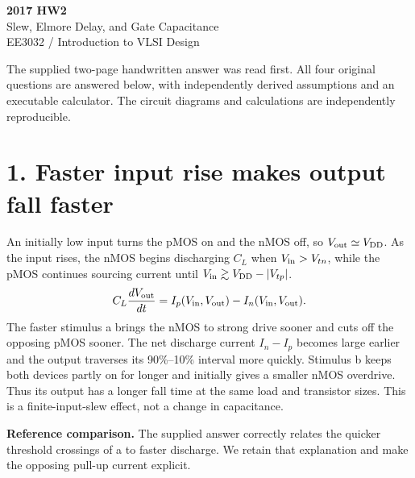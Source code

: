 \documentclass[11pt,a4paper]{article}
\newcommand{\VDD}{V_{\mathrm{DD}}}
\begin{document}
\begin{center}{\LARGE\bfseries 2017 HW2}\\[4pt]{\large Slew, Elmore Delay, and Gate Capacitance}\\[4pt]{\small EE3032 / Introduction to VLSI Design}\end{center}
The supplied two-page handwritten answer was read first. All four original questions are answered below, with independently derived assumptions and an executable calculator. The circuit diagrams and calculations are independently reproducible.
\section*{1. Faster input rise makes output fall faster}
An initially low input turns the pMOS on and the nMOS off, so $V_{\rm out}\simeq\VDD$. As the input rises, the nMOS begins discharging $C_L$ when $V_{\rm in}>V_{tn}$, while the pMOS continues sourcing current until $V_{\rm in}\gtrsim\VDD-|V_{tp}|$.
\[
 C_L\frac{dV_{\rm out}}{dt}=I_p(V_{\rm in},V_{\rm out})-I_n(V_{\rm in},V_{\rm out}).
\]
The faster stimulus a brings the nMOS to strong drive sooner and cuts off the opposing pMOS sooner. The net discharge current $I_n-I_p$ becomes large earlier and the output traverses its 90\%--10\% interval more quickly. Stimulus b keeps both devices partly on for longer and initially gives a smaller nMOS overdrive. Thus its output has a longer fall time at the same load and transistor sizes. This is a finite-input-slew effect, not a change in capacitance.
\begin{center}\end{center}
\textbf{Reference comparison.} The supplied answer correctly relates the quicker threshold crossings of a to faster discharge. We retain that explanation and make the opposing pull-up current explicit.
\end{document}

